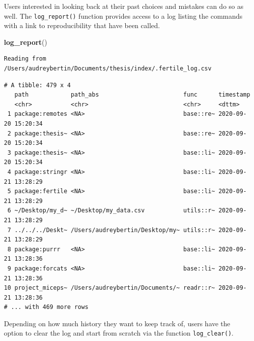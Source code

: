 \documentclass[12pt,twoside]{reedthesis}
\newenvironment{Shaded}{\begin{snugshade}}{\end{snugshade}}
\newcommand{\KeywordTok}[1]{\textcolor[rgb]{0.13,0.29,0.53}{\textbf{#1}}}
\newcommand{\NormalTok}[1]{#1}
\begin{document}
Users interested in looking back at their past choices and mistakes can
do so as well. The \texttt{log\_report()} function provides access to a
log listing the commands with a link to reproducibility that have been
called.
\begin{Shaded}
\begin{Highlighting}[]
\KeywordTok{log_report}\NormalTok{()}
\end{Highlighting}
\end{Shaded}
\begin{verbatim}
Reading from /Users/audreybertin/Documents/thesis/index/.fertile_log.csv
\end{verbatim}
\begin{verbatim}
# A tibble: 479 x 4
   path            path_abs                        func      timestamp          
   <chr>           <chr>                           <chr>     <dttm>             
 1 package:remotes <NA>                            base::re~ 2020-09-20 15:20:34
 2 package:thesis~ <NA>                            base::re~ 2020-09-20 15:20:34
 3 package:thesis~ <NA>                            base::li~ 2020-09-20 15:20:34
 4 package:stringr <NA>                            base::li~ 2020-09-21 13:28:29
 5 package:fertile <NA>                            base::li~ 2020-09-21 13:28:29
 6 ~/Desktop/my_d~ ~/Desktop/my_data.csv           utils::r~ 2020-09-21 13:28:29
 7 ../../../Deskt~ /Users/audreybertin/Desktop/my~ utils::r~ 2020-09-21 13:28:29
 8 package:purrr   <NA>                            base::li~ 2020-09-21 13:28:36
 9 package:forcats <NA>                            base::li~ 2020-09-21 13:28:36
10 project_miceps~ /Users/audreybertin/Documents/~ readr::r~ 2020-09-21 13:28:36
# ... with 469 more rows
\end{verbatim}
Depending on how much history they want to keep track of, users have the
option to clear the log and start from scratch via the function
\texttt{log\_clear()}.
\end{document}
